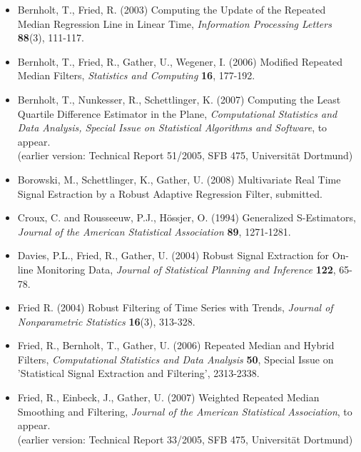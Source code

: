 \documentclass[a4paper]{scrartcl}
\begin{document}
\renewcommand{\labelitemi}{ }
\begin{itemize}
\item
Bernholt, T., Fried, R. (2003) Computing the Update of the Repeated
Median Regression Line in Linear Time, \emph{Information Processing
Letters} \textbf{88}(3), 111-117.

\item
Bernholt, T., Fried, R., Gather, U., Wegener, I. (2006) Modified
Repeated Median Filters, \emph{Statistics and Computing} \textbf{16}, 177-192.

\item
Bernholt, T., Nunkesser, R., Schettlinger, K. (2007) Computing
the Least Quartile Difference Estimator in the Plane,
\emph{Computational Statistics and Data Analysis, Special Issue on
Statistical Algorithms and Software}, to appear.\\
(earlier version:
Technical Report 51/2005, SFB 475, Universit\"{a}t Dortmund)

\item
Borowski, M., Schettlinger, K., Gather, U. (2008) Multivariate Real Time
Signal Estraction by a Robust Adaptive Regression Filter, submitted.

\item
Croux, C. and Rousseeuw, P.J., H\"{o}ssjer, O.
(1994) Generalized S-Estimators, \emph{Journal of the American Statistical
Association}
\textbf{89}, 1271-1281.

\item
Davies, P.L., Fried, R., Gather, U. (2004) Robust Signal Extraction
for On-line Monitoring Data, \emph{Journal of Statistical Planning
and Inference} \textbf{122}, 65-78.

\item
Fried R. (2004) Robust Filtering of Time Series with Trends, \emph{Journal
of Nonparametric Statistics} \textbf{16}(3), 313-328.

\item
Fried, R., Bernholt, T., Gather, U. (2006) Repeated Median and
Hybrid Filters, \emph{Computational Statistics and Data Analysis} \textbf{50},
Special Issue on 'Statistical Signal Extraction and Filtering',
2313-2338.

\item
Fried, R., Einbeck, J., Gather, U. (2007) Weighted Repeated Median
Smoothing and Filtering, \emph{Journal of the American Statistical
Association}, to appear.\\
(earlier version:
Technical Report 33/2005, SFB 475, Universit\"{a}t Dortmund)


\end{itemize}
\end{document}
